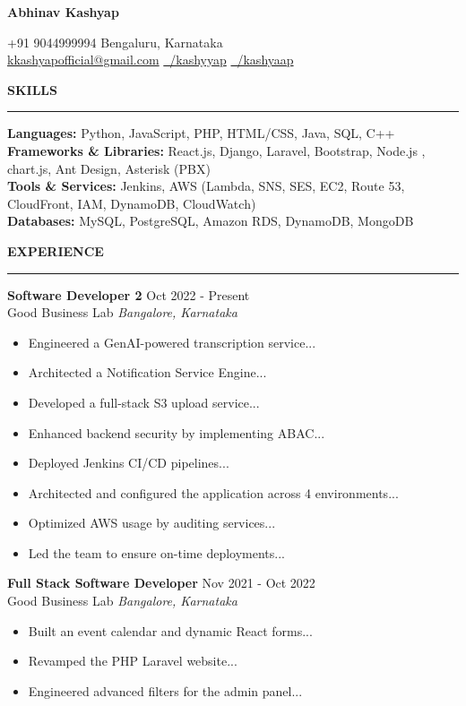\documentclass[10pt]{article}
\newcommand{\name}[1]{
    \begin{center}
        {\LARGE \bfseries #1}
    \end{center}
}
\newcommand{\contact}[1]{
    \begin{center}
        {\small #1}
    \end{center}
}
\newcommand{\rSection}[1]{
    \vspace{1em}
    {\large \bfseries \MakeUppercase{#1}}
    \vspace{0.5em}
    \hrule
}
\begin{document}
\name{Abhinav Kashyap}
\vspace{-3pt}
\contact{+91 9044999994  Bengaluru, Karnataka \\
\vspace{2pt}
\href{mailto:kkashyapofficial@gmail.com}{kkashyapofficial@gmail.com} \hspace{1em}
\href{https://www.linkedin.com/in/kashyyap/}{\faLinkedin\ /kashyyap} \hspace{1em}
\href{https://github.com/kashyaap}{\faGithub\ /kashyaap}}

\vspace{-12pt}
\rSection{Skills}
\textbf{Languages:} Python, JavaScript, PHP, HTML/CSS, Java, SQL, C++ \\[3pt]
\textbf{Frameworks \& Libraries:} React.js, Django, Laravel, Bootstrap, Node.js , chart.js, Ant Design, Asterisk (PBX) \\[3pt]
\textbf{Tools \& Services:} Jenkins, AWS (Lambda, SNS, SES, EC2, Route 53, CloudFront, IAM, DynamoDB, CloudWatch) \\[3pt]
\textbf{Databases:} MySQL, PostgreSQL, Amazon RDS, DynamoDB, MongoDB \\

\vspace{-17pt}
\rSection{Experience}

\textbf{Software Developer 2} \hfill Oct 2022 - Present\\
Good Business Lab \hfill \textit{Bangalore, Karnataka}
\begin{itemize}
    \item Engineered a GenAI-powered transcription service...
    \item Architected a Notification Service Engine...
    \item Developed a full-stack S3 upload service...
    \item Enhanced backend security by implementing ABAC...
    \item Deployed Jenkins CI/CD pipelines...
    \item Architected and configured the application across 4 environments...
    \item Optimized AWS usage by auditing services...
    \item Led the team to ensure on-time deployments...
\end{itemize}

\textbf{Full Stack Software Developer} \hfill Nov 2021 - Oct 2022\\
Good Business Lab \hfill \textit{Bangalore, Karnataka}
\begin{itemize}\vspace{2pt}
    \itemsep 1pt {} 
    \item Built an event calendar and dynamic React forms...
    \item Revamped the PHP Laravel website...
    \item Engineered advanced filters for the admin panel...
\end{itemize}
\end{document}
